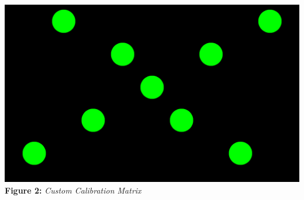 \documentclass[twoside,twocolumn]{article}
\begin{document}
\begin{center}
	\includegraphics[scale=0.12]{calibrationMatrix} \\
	\vspace{0.2cm}
	\small{\textbf{Figure 2:} \textit{Custom Calibration Matrix}}
\end{center}
\end{document}
